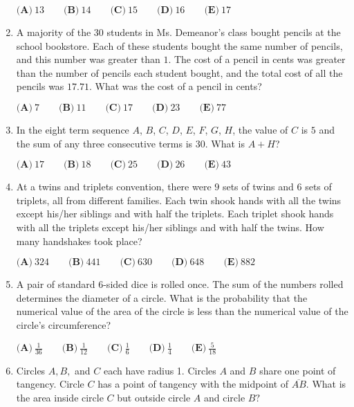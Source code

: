 \documentclass{article}
\begin{document}
\begin{enumerate}[label=\arabic*., itemsep=0.5em]
\(
\textbf{(A)}\ 13 \qquad
\textbf{(B)}\ 14 \qquad
\textbf{(C)}\ 15 \qquad
\textbf{(D)}\ 16 \qquad
\textbf{(E)}\ 17 \)\par \vspace{0.5em}\item A majority of the \(30\) students in Ms. Demeanor's class bought pencils at the school bookstore. Each of these students bought the same number of pencils, and this number was greater than \(1\). The cost of a pencil in cents was greater than the number of pencils each student bought, and the total cost of all the pencils was \(17.71\). What was the cost of a pencil in cents?

\(
\textbf{(A)}\ 7 \qquad
\textbf{(B)}\ 11 \qquad
\textbf{(C)}\ 17 \qquad
\textbf{(D)}\ 23 \qquad
\textbf{(E)}\ 77 \)\par \vspace{0.5em}\item In the eight term sequence \(A\), \(B\), \(C\), \(D\), \(E\), \(F\), \(G\), \(H\), the value of \(C\) is \(5\) and the sum of any three consecutive terms is \(30\). What is \(A+H\)?

\(
\textbf{(A)}\ 17 \qquad
\textbf{(B)}\ 18 \qquad
\textbf{(C)}\ 25 \qquad
\textbf{(D)}\ 26 \qquad
\textbf{(E)}\ 43 \)\par \vspace{0.5em}\item At a twins and triplets convention, there were \(9\) sets of twins and \(6\) sets of triplets, all from different families. Each twin shook hands with all the twins except his/her siblings and with half the triplets. Each triplet shook hands with all the triplets except his/her siblings and with half the twins. How many handshakes took place?

\(
\textbf{(A)}\ 324 \qquad
\textbf{(B)}\ 441 \qquad
\textbf{(C)}\ 630 \qquad
\textbf{(D)}\ 648 \qquad
\textbf{(E)}\ 882 \)\par \vspace{0.5em}\item A pair of standard \(6\)-sided dice is rolled once. The sum of the numbers rolled determines the diameter of a circle. What is the probability that the numerical value of the area of the circle is less than the numerical value of the circle's circumference?

\(
\textbf{(A)}\ \frac{1}{36} \qquad
\textbf{(B)}\ \frac{1}{12} \qquad
\textbf{(C)}\ \frac{1}{6} \qquad
\textbf{(D)}\ \frac{1}{4} \qquad
\textbf{(E)}\ \frac{5}{18} \)\par \vspace{0.5em}\item Circles \(A, B,\) and \(C\) each have radius 1. Circles \(A\) and \(B\) share one point of tangency. Circle \(C\) has a point of tangency with the midpoint of \(\overline{AB}.\) What is the area inside circle \(C\) but outside circle \(A\) and circle \(B?\)


\end{enumerate}
\end{document}
